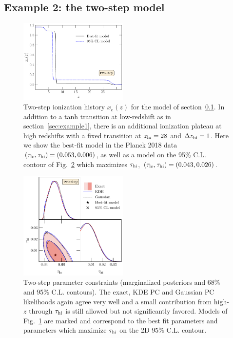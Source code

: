 \documentclass[aps,prd,twocolumn,amsmath,amssymb,showpacs,floatfix,superscriptaddress,nofootinbib]{revtex4-1}
\newcommand{\refsec}[1]{section~\ref{sec:#1}}
\newcommand{\tauhi}{\tau_{\rm hi}}
\newcommand{\taulo}{\tau_{\rm lo}}
\begin{document}
\subsection{Example 2: the two-step model}
\label{sec:example2}

\begin{figure}
\includegraphics[width=0.48\textwidth]{plot_xe_tanh_highz.pdf}
\caption{Two-step ionization history $x_e(z)$ for the model of \refsec{example2}. In addition to a tanh transition at low-redshift as in \refsec{example1}, there is an additional ionization plateau at high redshifts with a fixed transition at $z_{\rm hi} = 28$ and $\Delta z_{\rm hi} = 1$. Here we show the best-fit model in the Planck 2018 data $(\taulo, \tauhi) = (0.053, 0.006)$, as well as  a model on the 95\% C.L. contour of Fig.~\ref{fig:two_parameter_model_2D} which maximizes $\tauhi$, $(\taulo, \tauhi) = (0.043, 0.026)$. }
\label{fig:two_step_model}
\end{figure}

%
%

\begin{figure}[t]
\includegraphics[width=0.48\textwidth]{pl18_tanh_highz_test7_run1_vs_relike_tanh_highz_test9_run5_f0p14_taulo_prior_0p03_zre_prior_6p1_taulo_prior_0p0_tri.pdf}
\caption{Two-step parameter constraints (marginalized posteriors and 68\% and 95\% C.L. contours).  The exact, KDE PC and Gaussian PC likelihoods again agree very well and a small contribution from high-$z$ through $\tau_{\rm hi}$ is still allowed but not significantly favored.   Models of Fig.~\ref{fig:two_step_model} are marked and correspond to the best fit parameters and parameters 
which maximize $\tau_{\rm hi}$ on the 2D 95\% C.L. contour.
}
\label{fig:two_parameter_model_2D}
\end{figure}
\end{document}
